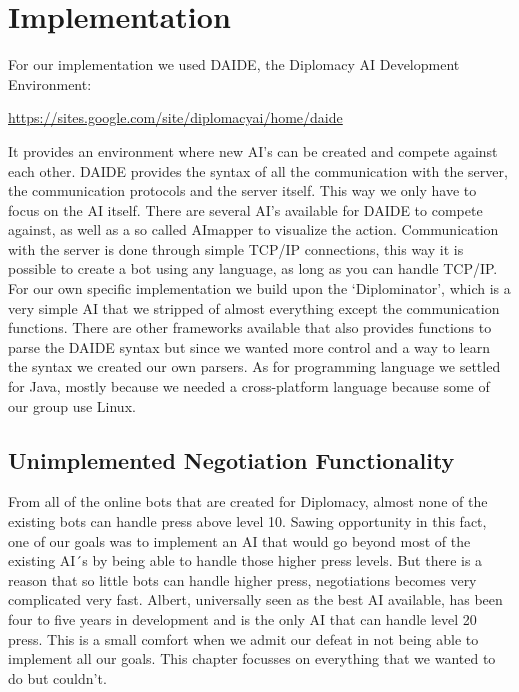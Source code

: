 \documentclass[a4paper]{article} %
\begin{document}
\section{Implementation}
For our implementation we used DAIDE, the Diplomacy AI Development Environment:
\begin{sloppypar}
\noindent\url{https://sites.google.com/site/diplomacyai/home/daide}
\end{sloppypar}
It provides an environment where new AI’s can be created and compete against each other. DAIDE provides the syntax of all the communication with the server, the communication protocols and the server itself. This way we only have to focus on the AI itself. 
There are several AI’s available for DAIDE to compete against, as well as a  so called AImapper to visualize the action. Communication with the server is done through simple TCP/IP connections, this way it is possible to create a bot using any language, as long as you can handle TCP/IP. 
For our own specific implementation we build upon the ‘Diplominator’, which is a very simple AI that we stripped of almost everything except the communication functions. There are other frameworks available that also provides functions to parse the DAIDE syntax but since we wanted more control and a way to learn the syntax we created our own parsers. As for programming language we settled for Java, mostly because we needed a cross-platform language because some of our group use Linux. 

\subsection{Unimplemented Negotiation Functionality}

From all of the online bots that are created for Diplomacy, almost none of the existing bots can handle press above level 10. Sawing opportunity in this fact, one of our goals was to implement an AI that would go beyond most of the existing AI´s by being able to handle those higher press levels. But there is a reason that so little bots can handle higher press, negotiations becomes very complicated very fast. Albert, universally seen as the best AI available, has been four to five years in development and is the only AI that can handle level 20 press. This is a small comfort when we admit our defeat in not being able to implement all our goals. This chapter focusses on everything that we wanted to do but couldn't.
\end{document}
